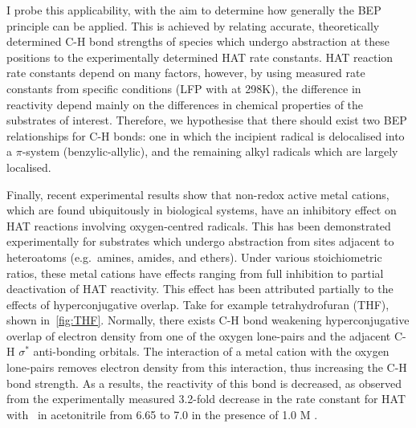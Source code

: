 I probe this applicability, with the aim to determine how generally the BEP principle can be applied. This is achieved by relating accurate, theoretically determined C-H bond strengths of species which undergo abstraction at these positions to the experimentally determined HAT rate constants. HAT reaction rate constants depend on many factors, however, by using measured rate constants from specific conditions (LFP with \cumo at 298K), the difference in reactivity depend mainly on the differences in chemical properties of the substrates of interest. Therefore, we hypothesise that there should exist two BEP relationships for C-H bonds: one in which the incipient radical is delocalised into a $\pi$-system (benzylic-allylic), and the remaining alkyl radicals which are largely localised.

Finally, recent experimental results show that non-redox active metal cations, which are found ubiquitously in biological systems, have an inhibitory effect on HAT reactions involving oxygen-centred radicals. This has been demonstrated experimentally for substrates which undergo abstraction from sites adjacent to heteroatoms (e.g.\ amines, amides, and ethers). Under various stoichiometric ratios, these metal cations have effects ranging from full inhibition to partial deactivation of HAT reactivity.\cite{Salamone2013, Salamone2015metals, Salamone2016} This effect has been attributed partially to the effects of hyperconjugative overlap. Take for example tetrahydrofuran (THF), shown in~\ref{fig:THF}. Normally, there exists C-H bond weakening hyperconjugative overlap of electron density from one of the oxygen lone-pairs and the adjacent C-H $\sigma^*$ anti-bonding orbitals. The interaction of a metal cation with the oxygen lone-pairs removes electron density from this interaction, thus increasing the C-H bond strength. As a results, the reactivity of this bond is decreased, as observed from the experimentally measured 3.2-fold decrease in the rate constant for HAT with \cumo~in acetonitrile from 6.65  \Ms to 7.0  \Ms in the presence of 1.0 M .\cite{Salamone2013}

